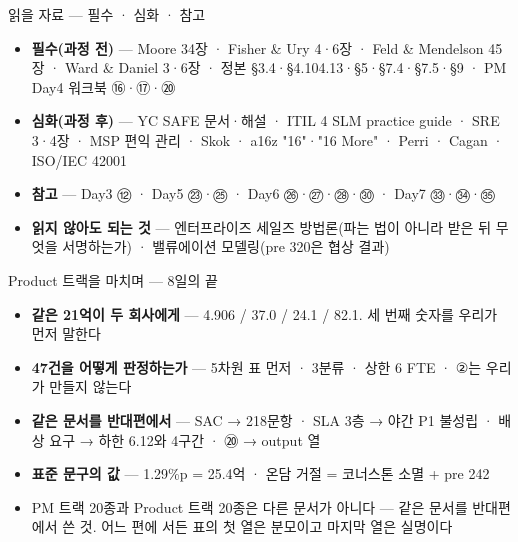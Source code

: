 \begin{frame}{읽을 자료 — 필수 · 심화 · 참고}
\begin{itemize}
\item \textbf{필수(과정 전)} — Moore 3\til{}4장 · Fisher \& Ury 4·6장 · Feld \& Mendelson 4\til{}5장 · Ward \& Daniel 3·6장 · 정본 §3.4·§4.10\til{}4.13·§5·§7.4·§7.5·§9 · PM Day4 워크북 ⑯·⑰·⑳
\item \textbf{심화(과정 후)} — YC SAFE 문서·해설 · ITIL 4 SLM practice guide · SRE 3·4장 · MSP 편익 관리 · Skok · a16z "16"·"16 More" · Perri · Cagan · ISO/IEC 42001
\item \textbf{참고} — Day3 ⑫ · Day5 ㉓·㉕ · Day6 ㉖·㉗·㉘·㉚ · Day7 ㉝·㉞·㉟
\item \textbf{읽지 않아도 되는 것} — 엔터프라이즈 세일즈 방법론(파는 법이 아니라 받은 뒤 무엇을 서명하는가) · 밸류에이션 모델링(pre 320은 협상 결과)
\end{itemize}
\end{frame}

\begin{frame}{Product 트랙을 마치며 — 8일의 끝}
\begin{itemize}
\item \textbf{같은 21억이 두 회사에게} — 4.906 / 37.0 / 24.1 / 82.1. 세 번째 숫자를 우리가 먼저 말한다
\item \textbf{47건을 어떻게 판정하는가} — 5차원 표 먼저 · 3분류 · 상한 6 FTE · ②는 우리가 만들지 않는다
\item \textbf{같은 문서를 반대편에서} — SAC → 218문항 · SLA 3층 → 야간 P1 불성립 · 배상 요구 → 하한 6.12와 4구간 · ⑳ → output 열
\item \textbf{표준 문구의 값} — 1.29\%p = 25.4억 · 온담 거절 = 코너스톤 소멸 + pre 242
\item PM 트랙 20종과 Product 트랙 20종은 다른 문서가 아니다 — 같은 문서를 반대편에서 쓴 것. 어느 편에 서든 표의 첫 열은 분모이고 마지막 열은 실명이다
\end{itemize}
\end{frame}
